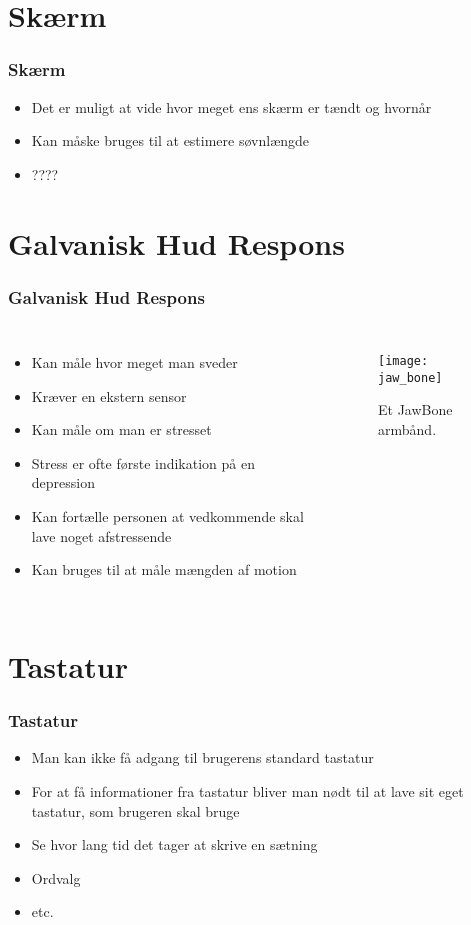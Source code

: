 \section{Skærm}
\begin{frame}
\frametitle{Skærm}
\begin{itemize}
\item Det er muligt at vide hvor meget ens skærm er tændt og hvornår
\item Kan måske bruges til at estimere søvnlængde
\item ????
\end{itemize}
\end{frame}


\section{Galvanisk Hud Respons}
\begin{frame}
\frametitle{Galvanisk Hud Respons}
\begin{columns}
\column[t]{5cm}
\begin{itemize}
\item Kan måle hvor meget man sveder
\item Kræver en ekstern sensor
\item Kan måle om man er stresset
\item Stress er ofte første indikation på en depression
\item Kan fortælle personen at vedkommende skal lave noget afstressende
\item Kan bruges til at måle mængden af motion
\end{itemize}
\column[t]{5cm}
\begin{figure}
\texttt{[image: jaw\_bone]}
\caption{Et JawBone armbånd.}
\end{figure}
\end{columns}
\end{frame}


\section{Tastatur}
\begin{frame}
\frametitle{Tastatur}
\begin{itemize}
\item Man kan ikke få adgang til brugerens standard tastatur
\item For at få informationer fra tastatur bliver man nødt til at lave sit eget tastatur, som brugeren skal bruge
\item Se hvor lang tid det tager at skrive en sætning
\item Ordvalg
\item etc.
\end{itemize}
\end{frame}

